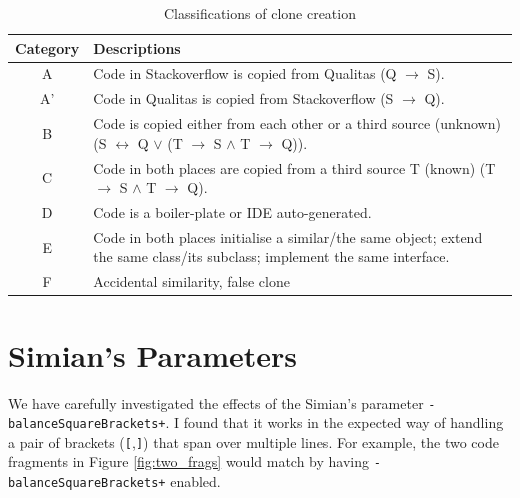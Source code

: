 \documentclass{IEEEtran}
\begin{document}
\begin{table}[H]
	\centering
	\caption{Classifications of clone creation}
	\label{tab:classification_scheme}
	\begin{tabular}{|c|p{13cm}|}
		\hline 
		Category & Descriptions \\ 
		\hline 
		A & Code in Stackoverflow is copied from Qualitas (Q $\rightarrow$ S). \\ 
		\hline 
		A' & Code in Qualitas is copied from Stackoverflow (S $\rightarrow$ Q). \\ 
		\hline 
		B & Code is copied either from each other or a third source (unknown) (S $\leftrightarrow$ Q $\vee$ (T $\rightarrow$ S $\wedge$ T $\rightarrow$ Q)).
		\\ 
		\hline 
		C & Code in both places are copied from a third source T (known) (T $\rightarrow$ S $\wedge$ T $\rightarrow$ Q).
		\\ 
		\hline 
		D & Code is a boiler-plate or IDE auto-generated.
		\\ 
		\hline 
		E & Code in both places initialise a similar/the same object; extend the same class/its subclass; implement the same interface.
		\\ 
		\hline 
		F & Accidental similarity, false clone \\ 
		\hline 
	\end{tabular} 
\end{table}

\newpage

\section*{Simian's Parameters}

We have carefully investigated the effects of the Simian's parameter \texttt{-balanceSquareBrackets+}. I found that it works in the expected way of handling a pair of brackets (\texttt{[},\texttt{]}) that span over multiple lines. For example, the two code fragments in Figure \ref{fig:two_frags} would match by having \texttt{-balanceSquareBrackets+} enabled.
\end{document}
